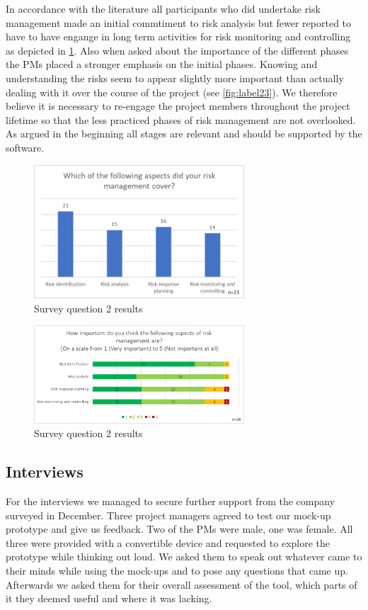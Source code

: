 In accordance with the literature all participants who did undertake risk management made an initial commtiment to risk analysis but fewer reported to have to have engange in long term activities for risk monitoring and controlling as depicted in \ref{fig:label22}. Also when asked about the importance of the different phases the PMs placed a stronger emphasis on the initial phases. Knowing and understanding the risks seem to appear slightly more important than actually dealing with it over the course of the project (see \ref{fig:label23}).  We therefore believe it is necessary to re-engage the project members throughout the project lifetime so that the less practiced phases of risk management are not overlooked. As argued in the beginning all stages are relevant and should be supported by the software. 
\begin{figure}[H]
	\centering
	\includegraphics[width=0.7\textwidth]{Assets/survey_results/Q3.png}
	\caption{Survey question 2 results}
	\label{fig:label22}
\end{figure}
\begin{figure}[H]
	\centering
	\includegraphics[width=0.7\textwidth]{Assets/survey_results/Q4.png}
	\caption{Survey question 2 results}
	\label{fig:label32}
\end{figure}

\subsection{Interviews}
\label{sec:DomainAb}
For the interviews we managed to secure further support from the company surveyed in December. Three project managers agreed to test our mock-up prototype and give us feedback. Two of the PMs were male, one was female. All three were provided with a convertible device and requested to explore the prototype while thinking out loud. We asked them to speak out whatever came to their minds while using the mock-ups and to pose any questions that came up. Afterwards we asked them for their overall assessment of the tool, which parts of it they deemed useful and where it was lacking.

